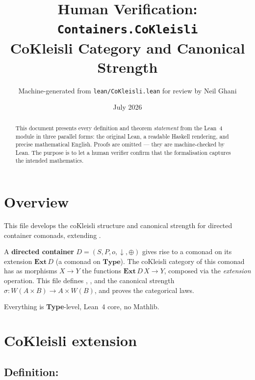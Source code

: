 \documentclass[11pt,a4paper]{article}
\title{Human Verification: \texttt{Containers.CoKleisli}\\[4pt]
  \large CoKleisli Category and Canonical Strength}
\author{Machine-generated from \texttt{lean/CoKleisli.lean} for review by Neil Ghani}
\date{July 2026}
\begin{document}
\maketitle

\begin{abstract}
This document presents every definition and theorem \emph{statement} from the
Lean~4 module  in three parallel forms: the original
Lean, a readable Haskell rendering, and precise mathematical English.  Proofs
are omitted --- they are machine-checked by Lean.  The purpose is to let a
human verifier confirm that the formalisation captures the intended mathematics.
\end{abstract}

\tableofcontents
\bigskip

\section{Overview}

This file develops the coKleisli structure and canonical strength for directed
container comonads, extending .

A \textbf{directed container} $D = (S, P, o, \downarrow, \oplus)$ gives rise to a
comonad on its extension $\mathbf{Ext}\,D$ (a comonad on $\mathbf{Type}$).  The
coKleisli category of this comonad has as morphisms $X \to Y$ the functions
$\mathbf{Ext}\,D\,X \to Y$, composed via the \emph{extension} operation.  This file
defines , , and the canonical strength
$\sigma : W(A \times B) \to A \times W(B)$, and proves the categorical laws.

Everything is \textbf{Type}-level, Lean~4 core, no Mathlib.

\section{CoKleisli extension}

\subsection{Definition: }
\end{document}
